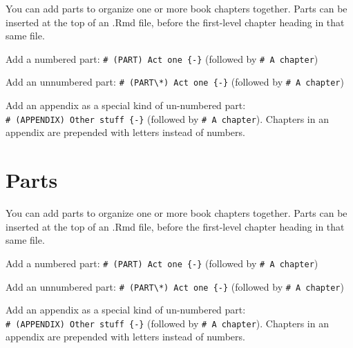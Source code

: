 \documentclass[
]{book}
\begin{document}
You can add parts to organize one or more book chapters together. Parts can be inserted at the top of an .Rmd file, before the first-level chapter heading in that same file.

Add a numbered part: \texttt{\#\ (PART)\ Act\ one\ \{-\}} (followed by \texttt{\#\ A\ chapter})

Add an unnumbered part: \texttt{\#\ (PART\textbackslash{}*)\ Act\ one\ \{-\}} (followed by \texttt{\#\ A\ chapter})

Add an appendix as a special kind of un-numbered part: \texttt{\#\ (APPENDIX)\ Other\ stuff\ \{-\}} (followed by \texttt{\#\ A\ chapter}). Chapters in an appendix are prepended with letters instead of numbers.

\hypertarget{parts}{%
\chapter{Parts}\label{parts}}

You can add parts to organize one or more book chapters together. Parts can be inserted at the top of an .Rmd file, before the first-level chapter heading in that same file.

Add a numbered part: \texttt{\#\ (PART)\ Act\ one\ \{-\}} (followed by \texttt{\#\ A\ chapter})

Add an unnumbered part: \texttt{\#\ (PART\textbackslash{}*)\ Act\ one\ \{-\}} (followed by \texttt{\#\ A\ chapter})

Add an appendix as a special kind of un-numbered part: \texttt{\#\ (APPENDIX)\ Other\ stuff\ \{-\}} (followed by \texttt{\#\ A\ chapter}). Chapters in an appendix are prepended with letters instead of numbers.

  
\end{document}
